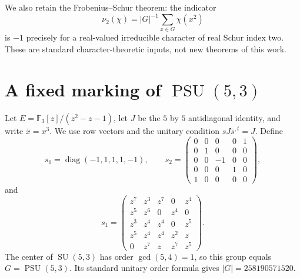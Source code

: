 \documentclass[11pt,a4paper]{article}
\begin{document}
We also retain the Frobenius--Schur theorem: the indicator
\[
 \nu_2(\chi)=|G|^{-1}\sum_{x\in G}\chi(x^2)
\]
is $-1$ precisely for a real-valued irreducible character of real
Schur index two. These are standard character-theoretic inputs,
not new theorems of this work.

\section{A fixed marking of \texorpdfstring{$\operatorname{PSU}(5,3)$}{PSU(5,3)}}
Let $E=\mathbb F_3[z]/(z^2-z-1)$, let $J$ be the $5$ by $5$
antidiagonal identity, and write $\bar x=x^3$. We use row vectors
and the unitary condition $sJ\bar s^{,t}=J$. Define
\[
 s_0=\operatorname{diag}(-1,1,1,1,-1),\qquad
 s_2=\begin{pmatrix}
 0&0&0&0&1\\0&1&0&0&0\\0&0&-1&0&0\\0&0&0&1&0\\1&0&0&0&0
 \end{pmatrix},
\]
and
\[
 s_1=\begin{pmatrix}
 z^7&z^3&z^7&0&z^4\\
 z^5&z^6&0&z^4&0\\
 z^3&z^4&z^4&0&z^5\\
 z^5&z^4&z^4&z^2&z\\
 0&z^7&z&z^7&z^5
 \end{pmatrix}.
\]
The center of $\operatorname{SU}(5,3)$ has order $\gcd(5,4)=1$,
so this group equals $G=\operatorname{PSU}(5,3)$. Its standard
unitary order formula gives $|G|=258190571520$.
\end{document}
